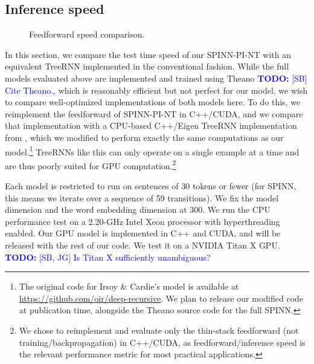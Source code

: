 \documentclass[11pt]{article}
\newcommand\todo[1]{\textcolor{blue}{\textbf{TODO:} #1}}
\begin{document}
\subsection{Inference speed}
\label{sec:speed}

\begin{figure}
\caption{Feedforward speed comparison.}
\label{fig:speed}
\end{figure}

In this section, we compare the test time speed of our SPINN-PI-NT with an equivalent TreeRNN implemented in the conventional fashion. While the full models evaluated above are implemented and trained using Theano \todo{[SB] Cite Theano.}, which is reasonably efficient but not perfect for our model, we wish to compare well-optimized implementations of both models here. To do this, we reimplement the feedforward of SPINN-PI-NT in C++/CUDA, and we compare that implementation with a CPU-based C++/Eigen TreeRNN implementation from \citet{irsoy2014deep}, which we modified to perform exactly the same computations as our model.\footnote{The original code for Irsoy \& Cardie's model is available at \url{https://github.com/oir/deep-recursive}. We plan to release our modified code at publication time, alongside the Theano source code for the full SPINN.} TreeRNNs like this can only operate on a single example at a time and are thus poorly suited for GPU computation.\footnote{We chose to reimplement and evaluate only the thin-stack feedforward (not training/backpropagation) in C++/CUDA, as feedforward/inference speed is the relevant performance metric for most practical applications.}

Each model is restricted to run on sentences of 30 tokens or fewer (for SPINN, this means we iterate over a sequence of 59 transitions). We fix the model dimension and the word embedding dimension at 300. We run the CPU performance test on a 2.20-GHz Intel Xeon processor with hyperthreading enabled. Our GPU model is implemented in C++ and CUDA, and will be released with the rest of our code. We test it on a NVIDIA Titan X GPU. \todo{[SB, JG] Is Titan X sufficiently unambiguous?}
\end{document}
